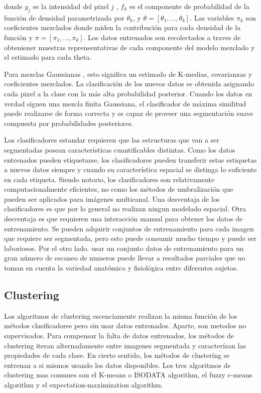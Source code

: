\documentclass[12pt]{report}
\begin{document}
donde $y_{j}$ es la intensidad del pixel $j$ , $f_{k}$ es el componente de probabilidad de la función de densidad parametrizada por $\theta_{k}$, y $\theta = [\theta_{1},...,\theta_{k}]$. Las variables $\pi_{k}$ son coeficientes mezclados donde miden la contribución para cada densidad de la función y $\pi = [\pi_{1},...,\pi_{k}]$.
Los datos entrenados son recolectados a traves de obteniener muestras reprensentativas de cada componente del modelo mezclado y el estimado para cada theta.

Para mezclas Gaussianas , esto significa un estimado de K-medias, covarianzas y coeficientes mezclados.
La clasificación de los nuevos datos es obtenida asignando cada pixel a la clase con la más alta probabilidad posterior. Cuando los datos en verdad siguen una mezcla finita Gaussiana, el clasificador de  máxima similitud puede realizarse de forma correcta y es capaz de proveer una segmentación suave compuesta por probabilidades posteriores.

Los clasificadores estandar requieren que las estructuras que van a ser segmentadas posean características cuantificables distintas. Como los datos entrenados pueden etiquetarse, los clasificadores pueden transferir estas estiquetas a nuevos datos siempre y cuando su característica espacial se distinga lo suficiente en cada etiqueta.
Siendo notorio, los clasificadores son relativamente computacionalmente eficientes, no como los métodos de umbralización que pueden ser aplicados para imágenes multicanal. Una desventaja de los clasificadores es que por lo general no realizan ningun modelado espacial. Otra desventaja es que requieren una interacción manual para obtener los datos de entrenamiento.
Se pueden adquirir conjuntos de entrenamiento para cada imagen que requiere ser segmentada, pero esto puede consumir mucho tiempo y puede ser laboriosos. Por el otro lado. usar un conjunto datos de entrenamiento para un gran número de escaneo de numeros puede llevar a resultados parciales que no toman en cuenta la variedad anatómica y fisiológica entre diferentes sujetos.\cite{metodos}

\subsection{Clustering}
Los algoritmos de clustering escenciamente realizan la misma función de los métodos clasificadores pero sin usar datos entrenados. Aparte, son metodos no supervisados. Para compensar la falta de datos entrenados, los métodos de clustering iteran alternadamente entre imagenes segmentada y caracterízan las propiedades de cada clase. En cierto sentido, los métodos de clustering se entrenan a si mismos usando los datos disponibles.
Los tres algoritmos de clustering mas comunes son el K-means o ISODATA algorithm, el fuzzy c-means algorithm y el expectation-maximization algorithm.\cite{split}
\end{document}
